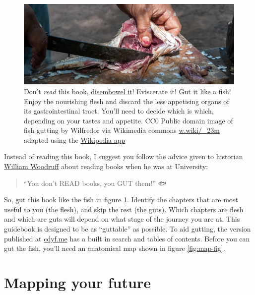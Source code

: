 \documentclass[
]{book}
\begin{document}
\begin{figure}

{\centering \includegraphics[width=1\linewidth]{images/fish-gutting} 

}

\caption{Don't \emph{read} this book, \href{https://en.wikipedia.org/wiki/Disembowelment}{disembowel it}! Eviscerate it! Gut it like a fish! Enjoy the nourishing flesh and discard the less appetising organs of its gastrointestinal tract. You'll need to decide which is which, depending on your tastes and appetite. CC0 Public domain image of fish gutting by Wilfredor via Wikimedia commons \href{https://w.wiki/_23m}{w.wiki/\_23m} adapted using the \href{https://apps.apple.com/gb/app/wikipedia/id324715238}{Wikipedia app}}\label{fig:gut-fig}
\end{figure}



Instead of reading this book, I suggest you follow the advice given to historian \href{https://en.wikipedia.org/wiki/William_Woodruff}{William Woodruff} about reading books when he was at University:

\begin{quote}
``You don't READ books, you GUT them!'' \citep{nabend} 🐟
\end{quote}

So, gut this book like the fish in figure \ref{fig:gut-fig}. Identify the chapters that are most useful to you (the flesh), and skip the rest (the guts). Which chapters are flesh and which are guts will depend on what stage of the journey you are at. This guidebook is designed to be as ``guttable'' as possible. To aid gutting, the version published at \href{https://www.cdyf.me/}{cdyf.me} has a built in search and tables of contents. Before you can gut the fish, you'll need an anatomical map shown in figure \ref{fig:map-fig}.

\hypertarget{mapping}{%
\section{Mapping your future}\label{mapping}}
\end{document}
